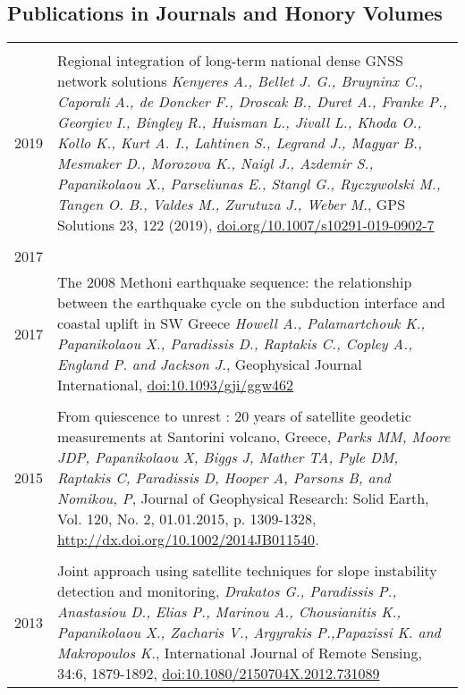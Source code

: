 \documentclass[9pt]{extarticle} %
\begin{document}
\subsection*{Publications in Journals and Honory Volumes}
%
\begin{longtable}{r|p{14cm}}
%
\multicolumn{2}{c}{} \\
  \textsc{2019}
%
  & Regional integration of long-term national dense GNSS network solutions
  \emph{Kenyeres A., Bellet J. G., Bruyninx C., Caporali A., de Doncker F., Droscak B., Duret A., Franke P., Georgiev I., Bingley R., Huisman L., Jivall L., Khoda O., Kollo K., Kurt A. I., Lahtinen S., Legrand J., Magyar B., Mesmaker D., Morozova K., Naigl J., Azdemir S., Papanikolaou X., Parseliunas E., Stangl G., Ryczywolski M., Tangen O. B., Valdes M., Zurutuza J., Weber M.}, GPS Solutions 23, 122 (2019), \href{https://doi.org/10.1007/s10291-019-0902-7}{doi.org/10.1007/s10291-019-0902-7}\\
\multicolumn{2}{c}{} \\
  \textsc{2017}
%
\multicolumn{2}{c}{} \\
  \textsc{2017}
%
  & The 2008 Methoni earthquake sequence: the relationship between the earthquake cycle on the subduction interface and coastal uplift in SW Greece
  \emph{Howell A., Palamartchouk K., Papanikolaou X., Paradissis D., Raptakis C., Copley A., England P. and Jackson J.}, Geophysical Journal International, \href{https://doi.org/10.1093/gji/ggw462}{doi:10.1093/gji/ggw462}\\
%
\multicolumn{2}{c}{} \\
  \textsc{2015}
%
  & From quiescence to unrest : 20 years of satellite geodetic measurements at Santorini volcano, Greece,
  \emph{Parks MM, Moore JDP, Papanikolaou X, Biggs J, Mather TA, Pyle DM, Raptakis C, Paradissis D, Hooper A, Parsons B, and Nomikou, P}, Journal of Geophysical Research: Solid Earth, Vol. 120, No. 2, 01.01.2015, p. 1309-1328, \href{http://dx.doi.org/10.1002/2014JB011540}{http://dx.doi.org/10.1002/2014JB011540}.\\
%  
\multicolumn{2}{c}{} \\ 
  \textsc{2013}
%
  & Joint approach using satellite techniques for slope instability detection and monitoring,
  \emph{Drakatos G., Paradissis P., Anastasiou D., Elias P., Marinou A., Chousianitis K., Papanikolaou X., Zacharis V., Argyrakis P.,Papazissi K. and Makropoulos K.},
  International Journal of Remote Sensing, 34:6, 1879-1892, \href{http://www.tandfonline.com/doi/abs/10.1080/2150704X.2012.731089#.Uxni9meIaig}{doi:10.1080/2150704X.2012.731089}\\

\end{longtable}
\end{document}
